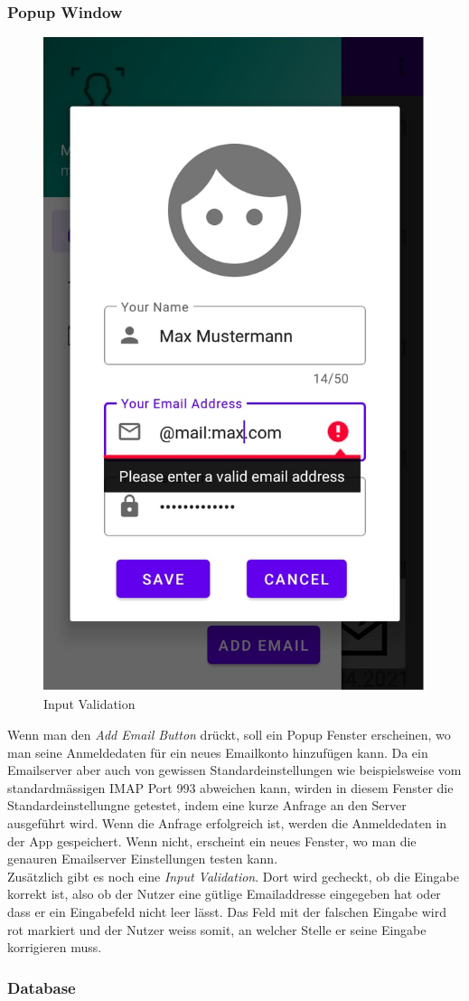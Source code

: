 \documentclass[a4paper,11pt]{article}
\begin{document}
\subsubsection{Popup Window}
\begin{figure}
\centering
\includegraphics[width=.18\textwidth]{media/inputValidation.png}
\caption{Input Validation}
\end{figure}
Wenn man den \textit{Add Email Button} drückt, soll ein Popup Fenster erscheinen, wo man seine Anmeldedaten für ein neues Emailkonto hinzufügen kann. Da ein Emailserver aber auch von gewissen Standardeinstellungen wie beispielsweise vom standardmässigen IMAP Port 993 abweichen kann, wirden in diesem Fenster die Standardeinstellungne getestet, indem eine kurze Anfrage an den Server ausgeführt wird. Wenn die Anfrage erfolgreich ist, werden die Anmeldedaten in der App gespeichert. Wenn nicht, erscheint ein neues Fenster, wo man die genauren Emailserver Einstellungen testen kann.\\

Zusätzlich gibt es noch eine \textit{Input Validation}. Dort wird gecheckt, ob die Eingabe korrekt ist, also ob der Nutzer eine gütlige Emailaddresse eingegeben hat oder dass er ein Eingabefeld nicht leer lässt. Das Feld mit der falschen Eingabe wird rot markiert und der Nutzer weiss somit, an welcher Stelle er seine Eingabe korrigieren muss.

\subsubsection{Database}

\end{document}

